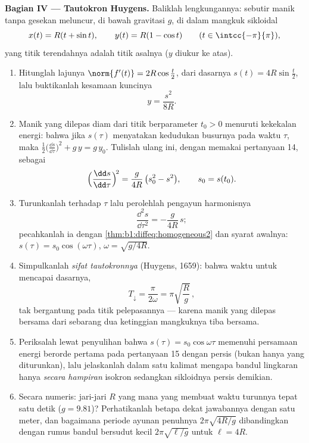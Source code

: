\begin{problem}
\medskip
\noindent\textbf{Bagian IV --- Tautokron Huygens.} Baliklah
lengkungannya: sebutir manik tanpa gesekan meluncur, di bawah gravitasi $g$, di dalam
mangkuk sikloidal
\[
x(t) = R(t + \sin t), \qquad y(t) = R(1 - \cos t)
\qquad (t \in \intcc{-\pi}{\pi}),
\]
yang titik terendahnya adalah titik asalnya ($y$ diukur ke atas).
\begin{enumerate}[resume]
  \item Hitunglah lajunya $\norm{f'(t)} = 2R\cos\frac t2$,
         dari dasarnya $s(t) = 4R\sin\frac t2$, lalu
        buktikanlah kesamaan kuncinya
        \[
        y = \frac{s^2}{8R} .
        \]
  \item Manik yang dilepas diam dari titik berparameter
        $t_0 > 0$ menuruti kekekalan energi: bahwa jika $s(\tau)$ menyatakan
        kedudukan busurnya pada waktu $\tau$, maka $\frac12\bigl(
        \frac{\dd s}{\dd\tau}\bigr)^2 + g\,y = g\,y_0$. Tulislah ulang
        ini, dengan memakai pertanyaan 14, sebagai
        \[
        \Bigl(\frac{\dd s}{\dd\tau}\Bigr)^{\!2}
        = \frac{g}{4R}\,\bigl(s_0^2 - s^2\bigr),
        \qquad s_0 = s(t_0).
        \]
  \item Turunkanlah terhadap $\tau$ lalu perolehlah
        pengayun harmonisnya
        \[
        \frac{\dd^2 s}{\dd\tau^2} = -\frac{g}{4R}\,s ;
        \]
        pecahkanlah ia dengan \cref{thm:b1:diffeq:homogeneous2} dan
        syarat awalnya: $s(\tau) = s_0\cos(\omega\tau)$,
        $\omega = \sqrt{g/4R}$.
  \item Simpulkanlah \emph{sifat tautokronnya} (Huygens, 1659):
        bahwa waktu untuk mencapai dasarnya,
        \[
        T_{\downarrow} = \frac{\pi}{2\omega}
        = \pi\sqrt{\frac Rg}\,,
        \]
        tak bergantung pada titik pelepasannya --- karena manik yang dilepas
        bersama dari sebarang dua ketinggian mangkuknya tiba
        bersama.
  \item Periksalah lewat penyulihan bahwa $s(\tau) =
        s_0\cos\omega\tau$ memenuhi persamaan energi berorde
        pertama pada pertanyaan 15 dengan persis (bukan hanya yang
        diturunkan), lalu jelaskanlah dalam satu kalimat mengapa
        bandul lingkaran hanya \emph{secara hampiran}
        isokron sedangkan sikloidnya persis demikian.
  \item Secara numeris: jari-jari $R$ yang mana yang membuat waktu turunnya
        tepat satu detik ($g = 9.81$)? Perhatikanlah betapa dekat
        jawabannya dengan satu meter, dan bagaimana periode ayunan
        penuhnya $2\pi\sqrt{4R/g}$ dibandingkan dengan rumus bandul
        bersudut kecil $2\pi\sqrt{\ell/g}$ untuk $\ell = 4R$.
\end{enumerate}


\end{problem}
